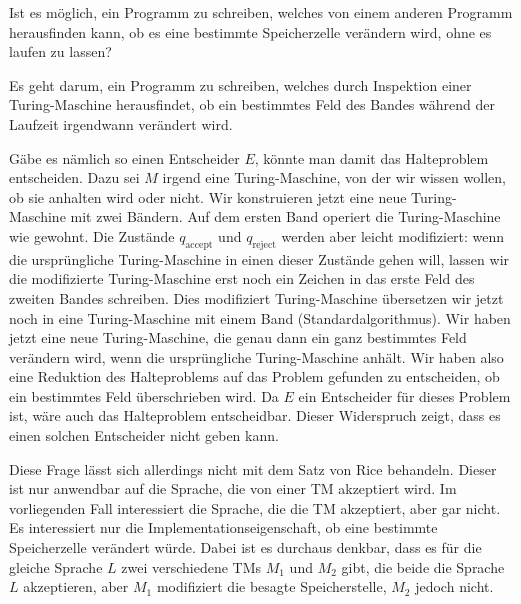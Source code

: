 Ist es möglich, ein Programm zu schreiben, welches von einem anderen
Programm herausfinden kann, ob es eine bestimmte Speicherzelle
verändern wird, ohne es laufen zu lassen?


\begin{loesung}
Es geht darum, ein Programm zu schreiben, welches durch Inspektion
einer Turing-Maschine herausfindet, ob ein bestimmtes Feld des
Bandes während der Laufzeit irgendwann verändert wird.

Gäbe es nämlich so einen Entscheider $E$, könnte man damit das Halteproblem
entscheiden. Dazu sei $M$ irgend eine Turing-Maschine, von der wir
wissen wollen, ob sie anhalten wird oder nicht.
Wir konstruieren jetzt eine neue Turing-Maschine mit zwei
Bändern. Auf dem ersten Band operiert die Turing-Maschine
wie gewohnt.
Die Zustände $q_\text{accept}$ und $q_\text{reject}$ werden
aber leicht modifiziert: wenn die ursprüngliche Turing-Maschine 
in einen dieser Zustände gehen will, lassen wir die modifizierte
Turing-Maschine erst noch ein Zeichen in das erste Feld des zweiten
Bandes schreiben. Dies modifiziert Turing-Maschine übersetzen wir jetzt noch
in eine Turing-Maschine mit einem Band (Standardalgorithmus). Wir haben
jetzt eine neue Turing-Maschine, die genau dann ein ganz bestimmtes
Feld verändern wird, wenn die ursprüngliche Turing-Maschine
anhält. Wir haben also eine Reduktion des Halteproblems auf das
Problem gefunden zu entscheiden, ob ein bestimmtes Feld überschrieben
wird. Da $E$ ein Entscheider für dieses Problem ist, wäre auch das
Halteproblem entscheidbar. Dieser Widerspruch zeigt, dass es einen
solchen Entscheider nicht geben kann.

Diese Frage lässt sich allerdings nicht mit dem Satz von Rice 
behandeln. Dieser ist nur anwendbar auf die Sprache, die von einer
TM akzeptiert wird. Im vorliegenden Fall interessiert die Sprache,
die die TM akzeptiert, aber gar nicht.
Es interessiert nur die Implementationseigenschaft, ob eine
bestimmte Speicherzelle verändert würde.
Dabei ist es durchaus denkbar, dass es für die gleiche Sprache $L$
zwei verschiedene TMs $M_1$ und $M_2$ gibt, die beide die Sprache $L$
akzeptieren, aber $M_1$ modifiziert die besagte Speicherstelle, $M_2$
jedoch nicht.
\end{loesung}

